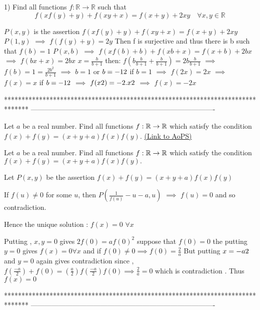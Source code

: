 \begin{solution}
	\begin{tcolorbox}1) Find all functions $f:\mathbb{R}\to\mathbb{R}$ such that
\[f(xf(y)+y)+f(xy+x)=f(x+y)+2xy \quad \forall x,y\in \mathbb{R}\]\end{tcolorbox}

$P(x,y)$ is the assertion $f(xf(y)+y)+f(xy+x)=f(x+y)+2xy$
$P(1,y)$ $\implies$ $f(f(y)+y)=2y$
Then f is surjective and thus there is b such that $f(b)=1$
$P(x,b)$ $\implies$ $f(xf(b)+b)+f(xb+x)=f(x+b)+2bx$ $\implies$ $f(bx+x)=2bx$
$x=\frac b{b+1}$ then:
$f(b\frac b{b+1}+\frac b{b+1})=2b\frac b{b+1}$ $\implies$ $f(b)=1=\frac {2b^2}{b+1}$ $\implies$ $b=1$ or $b=-1\/2$ 
if $b=1$ $\implies$ $f(2x)=2x$ $\implies$  $\boxed{f(x)=x}$
if $b=-1\/2$ $\implies$ $f(x\/2)=-2.x\/2$ $\implies$ $\boxed{f(x)=-2x}$
\end{solution}
*******************************************************************************
-------------------------------------------------------------------------------

\begin{problem}
	Let $a$ be a real number. Find all functions $f:\Bbb{R}\rightarrow\Bbb{R}$ which satisfy the condition $f(x)+f(y)=(x+y+a)f(x)f(y).$
	\flushright \href{https://artofproblemsolving.com/community/c6h561820}{(Link to AoPS)}
\end{problem}



\begin{solution}
	\begin{tcolorbox}Let $a$ be a real number. Find all functions $f:\Bbb{R}\rightarrow\Bbb{R}$ which satisfy the condition $f(x)+f(y)=(x+y+a)f(x)f(y).$\end{tcolorbox}
Let $P(x,y)$ be the assertion $f(x)+f(y)=(x+y+a)f(x)f(y)$

If $f(u)\ne 0$ for some $u$, then $P(\frac 1{f(u)}-u-a,u)$ $\implies$ $f(u)=0$ and so contradiction.

Hence the unique solution : $\boxed{f(x)=0}$ $\forall x$
\end{solution}



\begin{solution}
	Putting , $x,y=0$ gives $2f(0)=af(0)^2$ 
suppose that $f(0)=0$ the putting $y=0$ gives $f(x)=0 \forall x$ 
and if $f(0) \neq 0 \implies f(0)=\frac{2}{a}$ But putting $x=-a\/2$ and $y=0$ again gives contradiction since , $f(\frac{-a}{2})+f(0)=(\frac{a}{2})f(\frac{-a}{2})f(0) \implies \frac{2}{a}=0$ which is contradiction . 
Thus $f(x)=0$
\end{solution}
*******************************************************************************
-------------------------------------------------------------------------------


